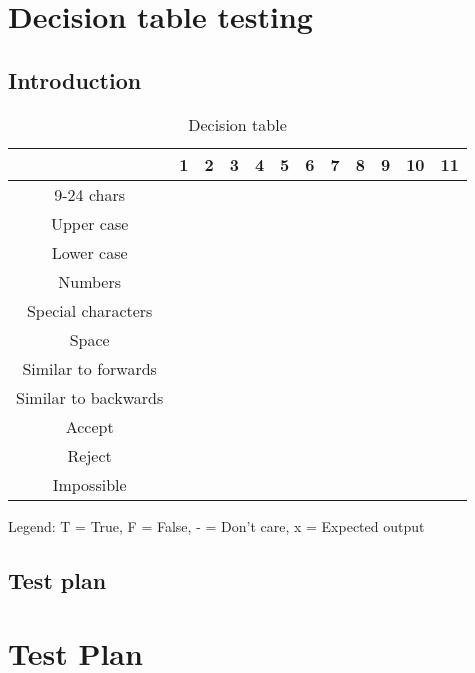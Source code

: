 \documentclass[12pt,letterpaper]{article}
\begin{document}
\section{Decision table testing}

\subsection{Introduction}

\begin{table}[h]
  \begin{center}
    \caption{Decision table}
    \label{tab:Decision table}
    
    \begin{tabular}{c|c|c|c|c|c|c|c|c|c|c|c|}
    & 1 & 2 & 3 & 4 & 5 & 6 & 7 & 8 & 9 & 10 & 11 \\
    \hline
    9-24 chars & & & & & & & & & & & \\
    \hline
    Upper case & & & & & & & & & & & \\
    \hline
    Lower case & & & & & & & & & & & \\
    \hline
    Numbers & & & & & & & & & & & \\
    \hline
    Special characters & & & & & & & & & & & \\
    \hline
    Space & & & & & & & & & & & \\
    \hline 
    Similar to forwards & & & & & & & & & & & \\
    \hline
    Similar to backwards & & & & & & & & & & & \\
    \midrule
    Accept & & & & & & & & & & & \\
    \hline
    Reject & & & & & & & & & & & \\
    Impossible & & & & & & & & & & & \\
    \end{tabular}
    
    Legend: T = True, F = False, - = Don't care, x = Expected output
  \end{center}
\end{table}



\subsection{Test plan}

\section{Test Plan}
\end{document}
